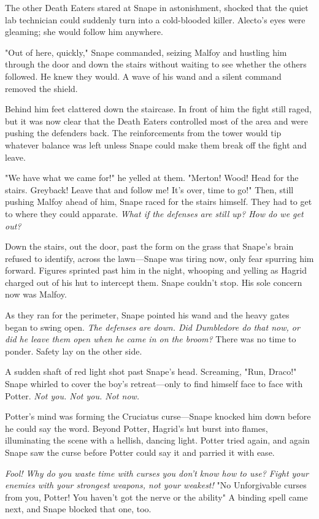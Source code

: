 The other Death Eaters stared at Snape in astonishment, shocked that the quiet lab technician could suddenly turn into a cold-blooded killer. Alecto's eyes were gleaming; she would follow him anywhere.

"Out of here, quickly," Snape commanded, seizing Malfoy and hustling him through the door and down the stairs without waiting to see whether the others followed. He knew they would. A wave of his wand and a silent command removed the shield.

Behind him feet clattered down the staircase. In front of him the fight still raged, but it was now clear that the Death Eaters controlled most of the area and were pushing the defenders back. The reinforcements from the tower would tip whatever balance was left unless Snape could make them break off the fight and leave.

"We have what we came for!" he yelled at them. "Merton! Wood! Head for the stairs. Greyback! Leave that and follow me! It's over, time to go!" Then, still pushing Malfoy ahead of him, Snape raced for the stairs himself. They had to get to where they could apparate. \emph{What if the defenses are still up? How do we get out?}

Down the stairs, out the door, past the form on the grass that Snape's brain refused to identify, across the lawn—Snape was tiring now, only fear spurring him forward. Figures sprinted past him in the night, whooping and yelling as Hagrid charged out of his hut to intercept them. Snape couldn't stop. His sole concern now was Malfoy.

As they ran for the perimeter, Snape pointed his wand and the heavy gates began to swing open. \emph{The defenses are down. Did Dumbledore do that now, or did he leave them open when he came in on the broom?} There was no time to ponder. Safety lay on the other side.

A sudden shaft of red light shot past Snape's head. Screaming, "Run, Draco!" Snape whirled to cover the boy's retreat—only to find himself face to face with Potter. \emph{Not you. Not you. Not now.}

Potter's mind was forming the Cruciatus curse—Snape knocked him down before he could say the word. Beyond Potter, Hagrid's hut burst into flames, illuminating the scene with a hellish, dancing light. Potter tried again, and again Snape saw the curse before Potter could say it and parried it with ease.

\emph{Fool! Why do you waste time with curses you don't know how to use? Fight your enemies with your strongest weapons, not your weakest!} "No Unforgivable curses from you, Potter! You haven't got the nerve or the ability{\el}" A binding spell came next, and Snape blocked that one, too.

